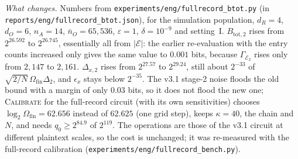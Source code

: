 \emph{What changes.} Numbers from \nolinkurl{experiments/eng/fullrecord_btot.py} (in \nolinkurl{reports/eng/fullrecord_btot.json}), for the simulation population, $d_R=4$, $d_O=6$, $n_A=14$, $\bar n_O=65{,}536$, $\varepsilon=1$, $\delta=10^{-9}$ and setting~I. $B_{\mathrm{tot},2}$ rises from $2^{26.592}$ to $2^{26.745}$, essentially all from $|\mathcal E|$: the earlier re-evaluation with the entry counts increased only gives the same value to $0.001$ bits, because $\Gamma_{\mathcal E_2}$ rises only from $2{,}147$ to $2{,}161$. $\Delta_{x,2}$ rises from $2^{27.57}$ to $2^{29.24}$, still about $2^{-33}$ of $\sqrt{2/N}\,\Omega_{\mathrm{fin}}\Delta_2$, and $\epsilon_x$ stays below $2^{-35}$. The v3.1 stage-2 noise floods the old bound with a margin of only $0.03$ bits, so it does not flood the new one; \textsc{Calibrate} for the full-record circuit (with its own sensitivities) chooses $\log_2\Omega_{\mathrm{fin}}=62.656$ instead of $62.625$ (one grid step), keeps $\kappa=40$, the chain and $N$, and needs $q_0\ge2^{84.9}$ of $2^{119}$. The operations are those of the v3.1 circuit at different plaintext scales, so the cost is unchanged; it was re-measured with the full-record calibration (\texttt{experiments/eng/fullrecord\_bench.py}).
